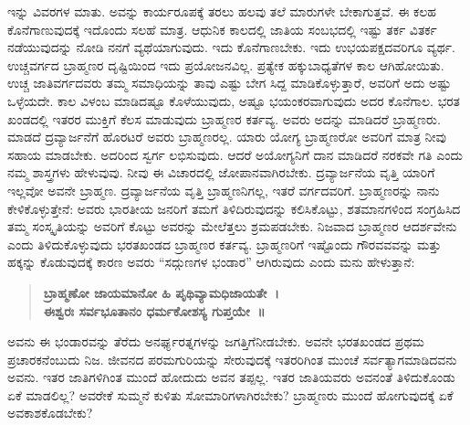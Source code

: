 ಇನ್ನು ವಿವರಗಳ ಮಾತು. ಅವನ್ನು ಕಾರ್ಯರೂಪಕ್ಕೆ ತರಲು ಹಲವು ತಲೆ ಮಾರುಗಳೇ ಬೇಕಾಗುತ್ತವೆ. ಈ ಕಲಹ ಕೊನೆಗಾಣುವುದಕ್ಕೆ ಇದೊಂದು ಸಲಹೆ ಮಾತ್ರ. ಆಧುನಿಕ ಕಾಲದಲ್ಲಿ ಜಾತಿಯ ಸಂಬಭದಲ್ಲಿ ಇಷ್ಟು ತರ್ಕ ವಿತರ್ಕ ನಡೆಯುವುದನ್ನು ನೋಡಿ ನನಗೆ ವ್ಯಥೆಯಾಗುವುದು. ಇದು ಕೊನೆಗಾಣಬೇಕು. ಇದು ಉಭಯಪಕ್ಷದವರಿಗೂ ವ್ಯರ್ಥ. ಉಚ್ಚವರ್ಗದ ಬ್ರಾಹ್ಮಣರ ದೃಷ್ಟಿಯಿಂದ ಇದು ಪ್ರಯೋಜನವಿಲ್ಲ. ಪ್ರತ್ಯೇಕ ಹಕ್ಕುಬಾಧ್ಯತೆಗಳ ಕಾಲ ಆಗಿಹೋಯಿತು. ಉಚ್ಚ ಜಾತಿವರ್ಗದವರು ತಮ್ಮ ಸಮಾಧಿಯನ್ನು ತಾವು ಎಷ್ಟು ಬೇಗ ಸಿದ್ದ ಮಾಡಿಕೊಳ್ಳುತ್ತಾರೆ, ಅವರಿಗೆ ಅದು ಅಷ್ಟು ಒಳ್ಳೆಯದೇ. ಕಾಲ ವಿಳಂಬ ಮಾಡಿದಷ್ಟೂ ಕೊಳೆಯುವುದು, ಅಷ್ಟೂ ಭಯಂಕರವಾಗುವುದು ಅದರ ಕೊನೆಗಾಲ. ಭರತ ಖಂಡದಲ್ಲಿ ಇತರರ ಮುಕ್ತಿಗೆ ಕೆಲಸ ಮಾಡುವುದು ಬ್ರಾಹ್ಮಣರ ಕರ್ತವ್ಯ. ಅವರು ಅದನ್ನು ಮಾಡಿದರೆ ಬ್ರಾಹ್ಮಣರು. ಮಾಡದೆ ದ್ರವ್ಯಾರ್ಜನೆಗೆ ಹೊರಟರೆ ಅವರು ಬ್ರಾಹ್ಮಣರಲ್ಲ. ಯಾರು ಯೋಗ್ಯ ಬ್ರಾಹ್ಮಣರೋ ಅವರಿಗೆ ಮಾತ್ರ ನೀವು ಸಹಾಯ ಮಾಡಬೇಕು. ಅದರಿಂದ ಸ್ವರ್ಗ ಲಭಿಸುವುದು. ಆದರೆ ಅಯೋಗ್ಯನಿಗೆ ದಾನ ಮಾಡಿದರೆ ನರಕವೇ ಗತಿ ಎಂದು ನಮ್ಮ ಶಾಸ್ತ್ರಗಳು ಹೇಳುವುವು. ನೀವು ಈ ವಿಚಾರದಲ್ಲಿ ಜೋಪಾನವಾಗಿರಬೇಕು. ದ್ರವ್ಯಾರ್ಜನೆಯ ವೃತ್ತಿ ಯಾರಿಗೆ ಇಲ್ಲವೋ ಅವನೇ ಬ್ರಾಹ್ಮಣ. ದ್ರವ್ಯಾರ್ಜನೆಯ ವೃತ್ತಿ ಬ್ರಾಹ್ಮಣನಿಗಲ್ಲ, ಇತರೆ ವರ್ಗದವರಿಗೆ. ಬ್ರಾಹ್ಮಣರನ್ನು ನಾನು ಕೇಳಿಕೊಳ್ಳುತ್ತೇನೆ: ಅವರು ಭಾರತೀಯ ಜನರಿಗೆ ತಮಗೆ ತಿಳಿದಿರುವುದನ್ನು ಕಲಿಸಿಕೊಟ್ಟು, ಶತಮಾನಗಳಿಂದ ಸಂಗ್ರಹಿಸಿದ ತಮ್ಮ ಸಂಸ್ಕೃತಿಯನ್ನು ಅವರಿಗೆ ಕೊಟ್ಟು ಅವರನ್ನು ಮೇಲೆತ್ತಲು ಶ್ರಮಪಡಬೇಕು. ನಿಜವಾದ ಬ್ರಾಹ್ಮಣರ ಆದರ್ಶವೇನು ಎಂದು ತಿಳಿದುಕೊಳ್ಳುವುದು ಭರತಖಂಡದ ಬ್ರಾಹ್ಮಣರ ಕರ್ತವ್ಯ. ಬ್ರಾಹ್ಮಣರಿಗೆ ಇಷ್ಟೊಂದು ಗೌರವವವನ್ನು ಮತ್ತು ಹಕ್ಕನ್ನು ಕೊಡುವುದಕ್ಕೆ ಕಾರಣ ಅವರು “ಸದ್ಗುಣಗಳ ಭಂಡಾರ” ಆಗಿರುವುದು ಎಂದು ಮನು ಹೇಳುತ್ತಾನೆ:

\begin{verse}
\textbf{ಬ್ರಾಹ್ಮಣೋ ಜಾಯಮಾನೋ ಹಿ ಪೃಥಿವ್ಯಾಮಧಿಜಾಯತೇ~।}\\\textbf{ಈಶ್ವರಃ ಸರ್ವಭೂತಾನಂ ಧರ್ಮಕೋಶಸ್ಯ ಗುಪ್ತಯೇ~॥}
\end{verse}


ಅವನು ಈ ಭಂಡಾರವನ್ನು ತೆರೆದು ಅನರ್ಘ್ಯರತ್ನಗಳನ್ನು ಜಗತ್ತಿಗೆನೀಡಬೇಕು. ಅವನೇ ಭರತಖಂಡದ ಪ್ರಥಮ ಪ್ರಚಾರಕನೆಂಬುದು ನಿಜ. ಜೀವನದ ಪರಮಗುರಿಯನ್ನು ಸೇರುವುದಕ್ಕೆ ಇತರರಿಗಿಂತ ಮುಂಚೆ ಸರ್ವತ್ಯಾಗಮಾಡಿದವನು ಅವನು. ಇತರ ಜಾತಿಗಳಿಗಿಂತ ಮುಂದೆ ಹೋದುದು ಅವನ ತಪ್ಪಲ್ಲ. ಇತರ ಜಾತಿಯವರು ಅವನಂತೆ ತಿಳಿದುಕೊಂಡು ಏಕೆ ಮಾಡಲಿಲ್ಲ? ಅವರೇಕೆ ಸುಮ್ಮನೆ ಕುಳಿತು ಸೋಮಾರಿಗಳಾಗಿರಬೇಕು? ಬ್ರಾಹ್ಮಣರು ಮುಂದೆ ಹೋಗುವುದಕ್ಕೆ ಏಕೆ ಅವಕಾಶಕೊಡಬೇಕು? 

